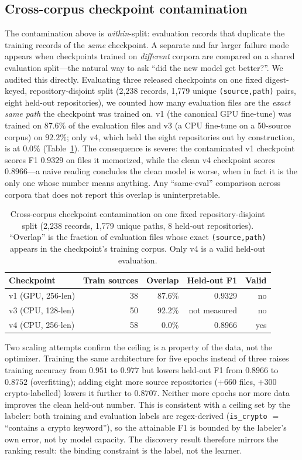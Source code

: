 \documentclass[conference,10pt]{IEEEtran}
\begin{document}
\subsection{Cross-corpus checkpoint contamination}
The contamination above is \emph{within}-split: evaluation records that duplicate the training
records of the \emph{same} checkpoint. A separate and far larger failure mode appears when
checkpoints trained on \emph{different} corpora are compared on a shared evaluation split---the
natural way to ask ``did the new model get better?''. We audited this directly. Evaluating three
released checkpoints on one fixed digest-keyed, repository-disjoint split (2{,}238 records,
1{,}779 unique \texttt{(source,path)} pairs, eight held-out repositories), we counted how many
evaluation files are the \emph{exact same path} the checkpoint was trained on. v1 (the canonical
GPU fine-tune) was trained on $87.6\%$ of the evaluation files and v3 (a CPU fine-tune on a
50-source corpus) on $92.2\%$; only v4, which held the eight repositories out by construction, is
at $0.0\%$ (Table~\ref{tab:leakage}). The consequence is severe: the contaminated v1 checkpoint
scores F1 $0.9329$ on files it memorized, while the clean v4 checkpoint scores $0.8966$---a naive
reading concludes the clean model is worse, when in fact it is the only one whose number means
anything. Any ``same-eval'' comparison across corpora that does not report this overlap is
uninterpretable.

\begin{table}[t]
\centering
\caption{Cross-corpus checkpoint contamination on one fixed repository-disjoint split (2{,}238
records, 1{,}779 unique paths, 8 held-out repositories). ``Overlap'' is the fraction of evaluation
files whose exact \texttt{(source,path)} appears in the checkpoint's training corpus. Only v4 is a
valid held-out evaluation.}
\label{tab:leakage}
\footnotesize
\begin{tabular}{@{}lrrrr@{}}
\toprule
Checkpoint & Train sources & Overlap & Held-out F1 & Valid \\
\midrule
v1 (GPU, 256-len) & 38 & 87.6\% & 0.9329 & no \\
v3 (CPU, 128-len) & 50 & 92.2\% & not measured & no \\
v4 (CPU, 256-len) & 58 & 0.0\%  & 0.8966 & yes \\
\bottomrule
\end{tabular}
\end{table}

Two scaling attempts confirm the ceiling is a property of the data, not the optimizer. Training the
same architecture for five epochs instead of three raises training accuracy from $0.951$ to $0.977$
but lowers held-out F1 from $0.8966$ to $0.8752$ (overfitting); adding eight more source
repositories ($+660$ files, $+300$ crypto-labelled) lowers it further to $0.8707$. Neither more
epochs nor more data improves the clean held-out number. This is consistent with a ceiling set by
the labeler: both training and evaluation labels are regex-derived (\texttt{is\_crypto} $=$
``contains a crypto keyword''), so the attainable F1 is bounded by the labeler's own error, not by
model capacity. The discovery result therefore mirrors the ranking result: the binding constraint is
the label, not the learner.
\end{document}
